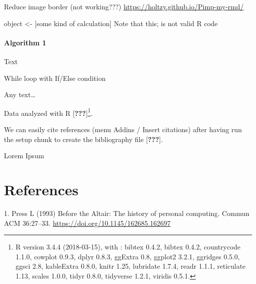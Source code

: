\documentclass[11pt,]{article}
\newenvironment{Shaded}{\begin{snugshade}}{\end{snugshade}}
\newcommand{\NormalTok}[1]{\textcolor[rgb]{0.12,0.11,0.11}{#1}}
\newcommand{\StringTok}[1]{\textcolor[rgb]{0.75,0.01,0.01}{#1}}
\let\oldparagraph\paragraph
\renewcommand{\paragraph}[1]{\oldparagraph{#1}\mbox{}}
\let\rmarkdownfootnote\footnote%
\def\footnote{\protect\rmarkdownfootnote}
\begin{document}
Reduce image border (not working???)
\url{https://holtzy.github.io/Pimp-my-rmd/}

\begin{Shaded}
\begin{Highlighting}[]
\NormalTok{object <-}\StringTok{ }\NormalTok{[some kind of calculation]}
\NormalTok{Note that this; is not valid R code}
\end{Highlighting}
\end{Shaded}

\hypertarget{algorithm-1-1}{%
\paragraph{Algorithm 1}\label{algorithm-1-1}}

Text

\begin{algorithm}[H]
\DontPrintSemicolon
\SetAlgoLined
{}
\BlankLine
{}
\caption{While loop with If/Else condition}
\end{algorithm}

Any text\ldots{}

Data analyzed with R {[}{\textbf{???}}{]}\footnote{R version 3.4.4
  (2018-03-15), with : bibtex 0.4.2, bibtex 0.4.2, countrycode 1.1.0,
  cowplot 0.9.3, dplyr 0.8.3, ggExtra 0.8, ggplot2 3.2.1, ggridges
  0.5.0, ggsci 2.8, kableExtra 0.8.0, knitr 1.25, lubridate 1.7.4, readr
  1.1.1, reticulate 1.13, scales 1.0.0, tidyr 0.8.0, tidyverse 1.2.1,
  viridis 0.5.1.}.

We can easily cite references (menu Addins / Insert citations) after
having run the setup chunk to create the bibliography file
{[}{\textbf{???}}{]}.

Lorem Ipsum

\hypertarget{references}{%
\section*{References}\label{references}}

\hypertarget{refs}{}
\leavevmode\hypertarget{ref-pressAltairHistoryPersonal1993}{}%
1. Press L (1993) Before the Altair: The history of personal computing.
Commun ACM 36:27--33. \url{https://doi.org/10.1145/162685.162697}
\end{document}
